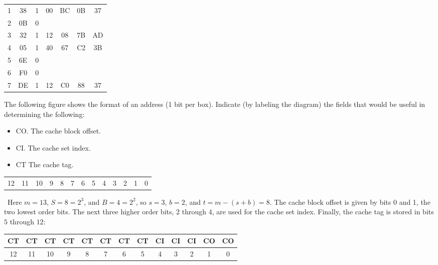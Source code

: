 \documentclass[12pt]{article}
\newenvironment{ex}[2][Exercise]{\begin{trivlist}
		\item[\hskip \labelsep {\bfseries #1}\hskip \labelsep {\bfseries #2.}]}{\end{trivlist}}
\newenvironment{sol}[1][Solution]{\begin{trivlist}
		\item[\hskip \labelsep {\bfseries #1:}]}{\end{trivlist}}
\begin{document}
\begin{ex}{6.12}
\begin{center}
\begin{tabular}{c|cccccc}
			1         & 38  & 1     & 00     & BC     & 0B     & 37\\
			
			2         & 0B  & 0     & \makebox[0.5cm]{\hrulefill} & \makebox[0.5cm]{\hrulefill} & \makebox[0.5cm]{\hrulefill} & \makebox[0.5cm]{\hrulefill}\\
			
			3         & 32  & 1     & 12     & 08     & 7B     & AD\\
			4         & 05  & 1     & 40     & 67     & C2     & 3B\\
			5         & 6E  & 0     & \makebox[0.5cm]{\hrulefill} & \makebox[0.5cm]{\hrulefill} & \makebox[0.5cm]{\hrulefill} & \makebox[0.5cm]{\hrulefill}\\
			6         & F0  & 0     & \makebox[0.5cm]{\hrulefill} & \makebox[0.5cm]{\hrulefill} & \makebox[0.5cm]{\hrulefill} & \makebox[0.5cm]{\hrulefill}\\
			7         & DE  & 1     & 12     & C0     & 88     & 37\\
		\end{tabular}
	\end{center}
	The following figure shows the format of an address (1 bit per box). Indicate (by labeling
	the diagram) the fields that would be useful in determining the following:
	\begin{itemize}
		\item CO. The cache block offset.
		\item CI. The cache set index.
		\item CT The cache tag.
	\end{itemize}
	\begin{center}
		\begin{tabular}{|c|c|c|c|c|c|c|c|c|c|c|c|c|}
			\hline
			{} & {} & {} & {} & {} & {} & {} & {} & {} & {} & {} & {} & {}\\
			\hline
			12 & 11 & 10 & 9 & 8 & 7 & 6 & 5 & 4 & 3 & 2 & 1 & 0
		\end{tabular}
	\end{center}
\end{ex}

\begin{sol}
	\
	Here $m=13$, $S=8=2^3$, and $B=4=2^2$, so $s=3$, $b=2$, and $t=m-(s + b)=8$. The cache
	block offset is given by bits 0 and 1, the two lowest order bits. The next three higher
	order bits, $2$ through $4$, are used for the cache set index. Finally, the cache tag
	is stored in bits $5$ through $12$:
	\begin{center}
		\begin{tabular}{|c|c|c|c|c|c|c|c|c|c|c|c|c|}
			\hline
			CT & CT & CT & CT & CT & CT & CT & CT & CI & CI & CI & CO & CO \\
			\hline
			12 & 11 & 10 & 9 & 8 & 7 & 6 & 5 & 4 & 3 & 2 & 1 & 0
		\end{tabular}
	\end{center}
\end{sol}
\end{document}
